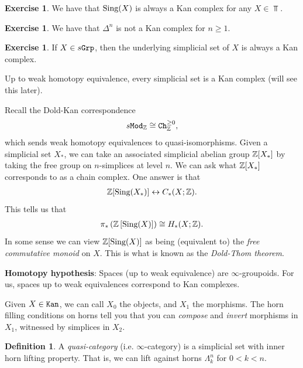 \documentclass[12pt]{amsart}
\theoremstyle{definition}
\newtheorem{definition}[theorem]{Definition}
\newtheorem{exercise}[theorem]{Exercise}
\begin{document}
\begin{exercise} We have that $\text{Sing}(X)$ is always a Kan complex for any $X\in \Top$.
\end{exercise}

\begin{exercise} We have that $\Delta^n$ is not a Kan complex for $n \ge 1$.
\end{exercise}

\begin{exercise} If $X \in s\texttt{Grp}$, then the underlying simplicial set of $X$ is always a Kan complex.
\end{exercise}

Up to weak homotopy equivalence, every simplicial set is a Kan complex (will see this later).

Recall the Dold-Kan correspondence
\begin{align*}
    s\texttt{Mod}_{\mathbb{Z}} \cong \texttt{Ch}_{\mathbb{Z}}^{\ge 0},
\end{align*}
which sends weak homotopy equivalences to quasi-isomorphisms. Given a simplicial set $X_\ast$, we can take an associated simplicial abelian group $\mathbb{Z}[X_\ast]$ by taking the free group on $n$-simplices at level $n$. We can ask what $\mathbb{Z}[X_\ast]$ corresponds to as a chain complex. One answer is that
\begin{align*}
    \mathbb{Z}[\text{Sing}(X_\ast)] \leftrightarrow C_\ast(X;\mathbb{Z}).
\end{align*}
This tells us that
\begin{align*}
    \pi_\ast \left( \mathbb{Z} \left[ \text{Sing}(X) \right] \right) \cong H_\ast(X;\mathbb{Z}).
\end{align*}
In some sense we can view $\mathbb{Z}[\text{Sing}(X)]$ as being (equivalent to) the \textit{free commutative monoid} on $X$. This is what is known as the \textit{Dold-Thom theorem}.

\textbf{Homotopy hypothesis}: Spaces (up to weak equivalence) are $\infty$-groupoids. For us, spaces up to weak equivalences correspond to Kan complexes.

Given $X\in \texttt{Kan}$, we can call $X_0$ the objects, and $X_1$ the morphisms. The horn filling conditions on horns tell you that you can \textit{compose} and \textit{invert} morphisms in $X_1$, witnessed by simplices in $X_2$.

\begin{definition} A \textit{quasi-category} (i.e. $\infty$-category) is a simplicial set with inner horn lifting property. That is, we can lift against horns $\Lambda^n_k$ for $0<k<n$.
\end{definition}
\end{document}
